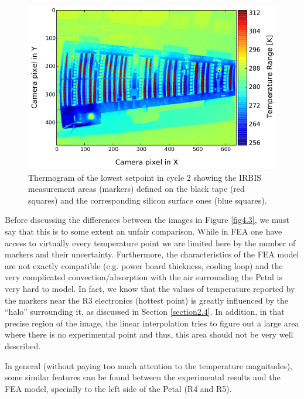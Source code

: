 		\begin{figure}[ht!]
			\centering
			\captionsetup{justification=centering,margin=2cm}
			\includegraphics[scale=0.65]{Figures/Chapter04/thermo_Temp_20170803154926.jpg}
			\caption{Thermogram of the lowest setpoint in cycle 2 showing the IRBIS measurement areas (markers) defined on the black tape (red squares) and the corresponding silicon surface ones (blue squares).}\label{fig4.2}
		\end{figure}
	
		Before discussing the differences between the images in Figure \ref{fig4.3}, we must say that this is to some extent an unfair comparison. While in FEA one have access to virtually every temperature point we are limited here by the number of markers and their uncertainty. Furthermore, the characteristics of the FEA model are not exactly compatible (e.g. power board thickness, cooling loop) and the very complicated convection/absorption with the air surrounding the Petal is very hard to model. In fact, we know that the values of temperature reported by the markers near the R3 electronics (hottest point) is greatly influenced by the “halo” surrounding it, as discussed in Section \ref{section2.4}. In addition, in that precise region of the image, the linear interpolation tries to figure out a large area where there is no experimental point and thus, this area should not be very well described.
		
		In general (without paying too much attention to the temperature magnitudes), some similar features can be found between the experimental results and the FEA model, specially to the left side of the Petal (R4 and R5).
		
